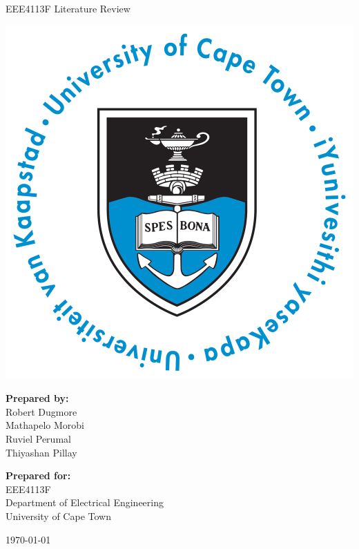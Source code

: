 \thispagestyle{empty}
\begin{center}
    
\Huge

\vspace{5cm}

EEE4113F Literature Review

\vspace{2.5cm}

\includegraphics[width=0.4\linewidth]{FrontMatter/UCT_logo.png}

\vfill

\large
\textbf{Prepared by:}\\
Robert Dugmore\\
Mathapelo Morobi\\
Ruviel Perumal\\
Thiyashan Pillay

\vspace{1cm}

\textbf{Prepared for:}\\
EEE4113F\\
Department of Electrical Engineering\\
University of Cape Town

\vspace{2cm}

\today


\end{center}